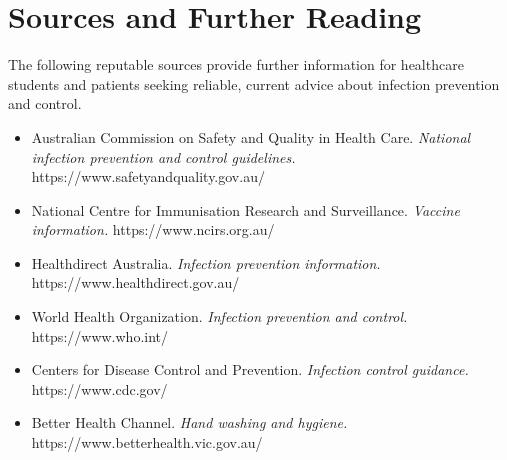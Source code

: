 \section*{Sources and Further Reading}
The following reputable sources provide further information for healthcare students and patients seeking reliable, current advice about infection prevention and control.
\begin{itemize}
    \item Australian Commission on Safety and Quality in Health Care. \textit{National infection prevention and control guidelines.} https://www.safetyandquality.gov.au/
    \item National Centre for Immunisation Research and Surveillance. \textit{Vaccine information.} https://www.ncirs.org.au/
    \item Healthdirect Australia. \textit{Infection prevention information.} https://www.healthdirect.gov.au/
    \item World Health Organization. \textit{Infection prevention and control.} https://www.who.int/
    \item Centers for Disease Control and Prevention. \textit{Infection control guidance.} https://www.cdc.gov/
    \item Better Health Channel. \textit{Hand washing and hygiene.} https://www.betterhealth.vic.gov.au/
\end{itemize}
